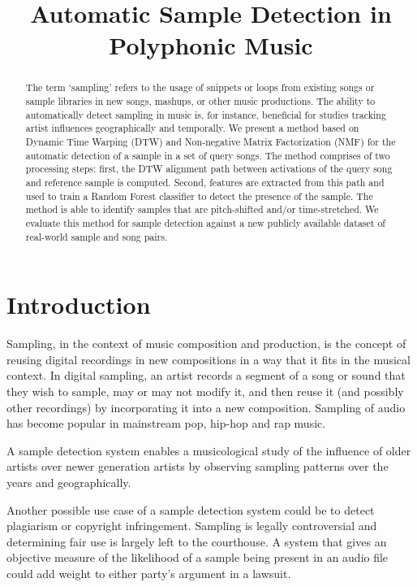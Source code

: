 \documentclass{article}
\title{Automatic Sample Detection in Polyphonic Music}
\begin{document}
%
\maketitle
%
\begin{abstract}
The term `sampling' refers to the usage of snippets or loops from existing songs or sample libraries in new songs, mashups, or other music productions. The ability to automatically detect sampling in music is, for instance, beneficial for studies tracking artist influences geographically and temporally. We present a method based on Dynamic Time Warping (DTW) and Non-negative Matrix Factorization (NMF) for the automatic detection of a sample in a set of query songs. The method comprises of two processing steps: first, the DTW alignment path between activations of the query song and reference sample is computed. Second, features are extracted from this path and used to train a Random Forest classifier to detect the presence of the sample. The method is able to identify samples that are pitch-shifted and/or time-stretched. We evaluate this method for sample detection against a new publicly available dataset of real-world sample and song pairs.
\end{abstract}
%
\section{Introduction}
\label{sec:intro}

Sampling, in the context of music composition and production, is the concept of reusing digital recordings in new compositions in a way that it fits in the musical context. In digital sampling, an artist records a segment of a song or sound that they wish to sample, may or may not modify it, and then reuse it (and possibly other recordings) by incorporating it into a new composition. Sampling of audio has become popular in mainstream pop, hip-hop and rap music. 

A sample detection system enables a musicological study of the influence of older artists over newer generation artists by observing sampling patterns over the years and geographically.

Another possible use case of a sample detection system could be to detect plagiarism or copyright infringement. Sampling is legally controversial and determining fair use is largely left to the courthouse. A system that gives an objective measure of the likelihood of a sample being present in an audio file could add weight to either party's argument in a lawsuit.
\end{document}
